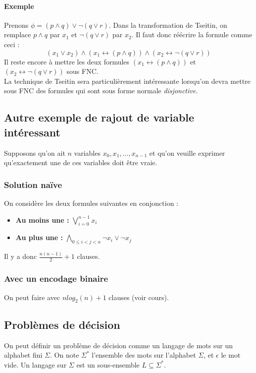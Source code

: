 \documentclass[a4paper]{article}
\begin{document}
    \paragraph{Exemple} Prenons $ \phi = (p \land q) \lor \lnot (q \lor r) $. Dans 
    la transformation de Tseitin, on remplace $p \land q$ par $x_1$ et $\lnot (q \lor r)$ par $x_2$.
    Il faut donc réécrire la formule comme ceci :
    $$ (x_1 \lor x_2) \land (x_1 \leftrightarrow (p \land q)) \land (x_2 \leftrightarrow \lnot (q \lor r) )$$
    Il reste encore à mettre les deux formules $(x_1 \leftrightarrow (p \land q))$ et $(x_2 \leftrightarrow \lnot (q \lor r))$ sous FNC.\\

  La technique de Tseitin sera particulièrement intéressante lorsqu'on devra mettre
  sous FNC des formules qui sont sous forme normale \textit{disjonctive}.

  \subsection{Autre exemple de rajout de variable intéressant}
  Supposons qu'on ait $n$ variables $x_0, x_1, ..., x_{n-1}$ et qu'on veuille
  exprimer qu'exactement une de ces variables doit être vraie. 

    \subsubsection{Solution naïve}
    On considère les deux formules suivantes en conjonction :
    \begin{itemize}
      \item \textbf{Au moins une :} $\bigvee^{n-1}_{i=0} x_i$
      \item \textbf{Au plus une :} $\bigwedge_{0 \leq i < j < n} \lnot x_i \lor \lnot x_j $
    \end{itemize}
    Il y a donc $\frac{n(n-1)}{2} + 1$ clauses.

    \subsubsection{Avec un encodage binaire}
    On peut faire avec $n log_2(n) + 1$ clauses (voir cours).

  \subsection{Problèmes de décision}
  On peut définir un problème de décision comme un langage de mots sur un alphabet
  fini $\Sigma$. On note $\Sigma^*$ l'ensemble des mots sur l'alphabet $\Sigma$, et
  $\epsilon$ le mot vide. Un langage sur $\Sigma$ est un sous-ensemble $L \subseteq \Sigma^*$. \\
\end{document}
